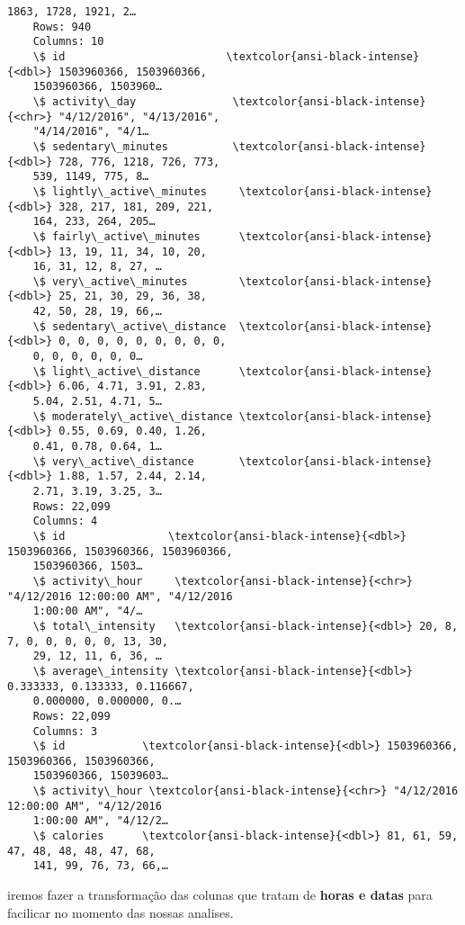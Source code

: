 \begin{Verbatim}[commandchars=\\\{\}]
    1863, 1728, 1921, 2…
    Rows: 940
    Columns: 10
    \$ id                         \textcolor{ansi-black-intense}{<dbl>} 1503960366, 1503960366,
    1503960366, 1503960…
    \$ activity\_day               \textcolor{ansi-black-intense}{<chr>} "4/12/2016", "4/13/2016",
    "4/14/2016", "4/1…
    \$ sedentary\_minutes          \textcolor{ansi-black-intense}{<dbl>} 728, 776, 1218, 726, 773,
    539, 1149, 775, 8…
    \$ lightly\_active\_minutes     \textcolor{ansi-black-intense}{<dbl>} 328, 217, 181, 209, 221,
    164, 233, 264, 205…
    \$ fairly\_active\_minutes      \textcolor{ansi-black-intense}{<dbl>} 13, 19, 11, 34, 10, 20,
    16, 31, 12, 8, 27, …
    \$ very\_active\_minutes        \textcolor{ansi-black-intense}{<dbl>} 25, 21, 30, 29, 36, 38,
    42, 50, 28, 19, 66,…
    \$ sedentary\_active\_distance  \textcolor{ansi-black-intense}{<dbl>} 0, 0, 0, 0, 0, 0, 0, 0, 0,
    0, 0, 0, 0, 0, 0…
    \$ light\_active\_distance      \textcolor{ansi-black-intense}{<dbl>} 6.06, 4.71, 3.91, 2.83,
    5.04, 2.51, 4.71, 5…
    \$ moderately\_active\_distance \textcolor{ansi-black-intense}{<dbl>} 0.55, 0.69, 0.40, 1.26,
    0.41, 0.78, 0.64, 1…
    \$ very\_active\_distance       \textcolor{ansi-black-intense}{<dbl>} 1.88, 1.57, 2.44, 2.14,
    2.71, 3.19, 3.25, 3…
    Rows: 22,099
    Columns: 4
    \$ id                \textcolor{ansi-black-intense}{<dbl>} 1503960366, 1503960366, 1503960366,
    1503960366, 1503…
    \$ activity\_hour     \textcolor{ansi-black-intense}{<chr>} "4/12/2016 12:00:00 AM", "4/12/2016
    1:00:00 AM", "4/…
    \$ total\_intensity   \textcolor{ansi-black-intense}{<dbl>} 20, 8, 7, 0, 0, 0, 0, 0, 13, 30,
    29, 12, 11, 6, 36, …
    \$ average\_intensity \textcolor{ansi-black-intense}{<dbl>} 0.333333, 0.133333, 0.116667,
    0.000000, 0.000000, 0.…
    Rows: 22,099
    Columns: 3
    \$ id            \textcolor{ansi-black-intense}{<dbl>} 1503960366, 1503960366, 1503960366,
    1503960366, 15039603…
    \$ activity\_hour \textcolor{ansi-black-intense}{<chr>} "4/12/2016 12:00:00 AM", "4/12/2016
    1:00:00 AM", "4/12/2…
    \$ calories      \textcolor{ansi-black-intense}{<dbl>} 81, 61, 59, 47, 48, 48, 48, 47, 68,
    141, 99, 76, 73, 66,…
\end{Verbatim}

iremos fazer a transformação das colunas que tratam de \textbf{horas e
    datas} para facilicar no momento das nossas analises.

